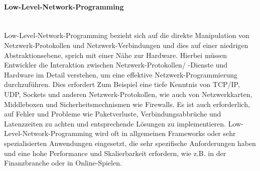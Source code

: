\documentclass[../vs-script-first-v01.tex]{subfiles}
\begin{document}
\paragraph{Low-Level-Network-Programming}\mbox{}\\
Low-Level-Network-Programming bezieht sich auf die direkte Manipulation von Netzwerk-Protokollen und Netzwerk-Verbindungen und dies auf einer niedrigen Abstraktionsebene, sprich mit einer Nähe zur Hardware. Hierbei müssen Entwickler die Interaktion zwischen Netzwerk-Protokollen/ -Dienste und Hardware im Detail verstehen, um eine effektive Netzwerk-Programmierung durchzuführen. Dies erfordert Zum Beispiel eine tiefe Kenntnis von TCP/IP, UDP, Sockets und anderen Netzwerk-Protokollen, wie auch von Netzwerkkarten, Middleboxen und Sicherheitsmechnismen wie Firewalls. Es ist auch erforderlich, auf Fehler und Probleme wie Paketverluste, Verbindungsabbrüche und Latenzzeiten zu achten und entsprechende Lösungen zu implementieren. Low-Level-Network-Programming wird oft in allgemeinen Frameworks oder sehr spezialisierten Anwendungen eingesetzt, die sehr spezifische Anforderungen haben und eine hohe Performance und Skalierbarkeit erfordern, wie z.B. in der Finanzbranche oder in Online-Spielen.
\end{document}
